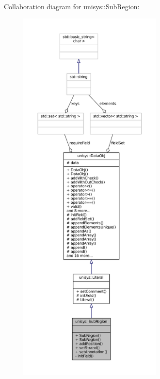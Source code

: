 Collaboration diagram for unisys\-:\-:Sub\-Region\-:
\nopagebreak
\begin{figure}[H]
\begin{center}
\leavevmode
\includegraphics[height=550pt]{classunisys_1_1SubRegion__coll__graph}
\end{center}
\end{figure}
